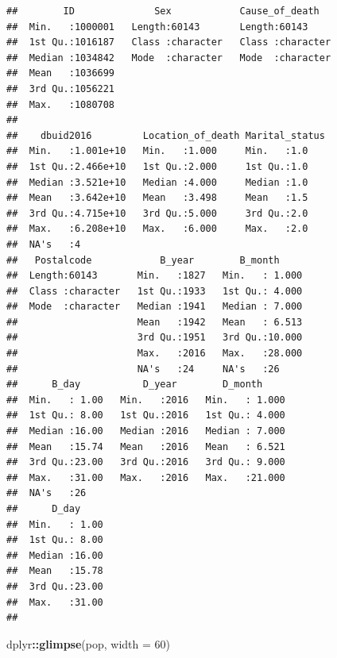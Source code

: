 \documentclass[
  11pt,
  oneside]{book}
\newenvironment{Shaded}{\begin{snugshade}}{\end{snugshade}}
\newcommand{\AttributeTok}[1]{\textcolor[rgb]{0.13,0.29,0.53}{#1}}
\newcommand{\DecValTok}[1]{\textcolor[rgb]{0.00,0.00,0.81}{#1}}
\newcommand{\FunctionTok}[1]{\textcolor[rgb]{0.13,0.29,0.53}{\textbf{#1}}}
\newcommand{\NormalTok}[1]{#1}
\newcommand{\SpecialCharTok}[1]{\textcolor[rgb]{0.81,0.36,0.00}{\textbf{#1}}}
\begin{document}
\begin{verbatim}
##        ID              Sex            Cause_of_death    
##  Min.   :1000001   Length:60143       Length:60143      
##  1st Qu.:1016187   Class :character   Class :character  
##  Median :1034842   Mode  :character   Mode  :character  
##  Mean   :1036699                                        
##  3rd Qu.:1056221                                        
##  Max.   :1080708                                        
##                                                         
##    dbuid2016         Location_of_death Marital_status
##  Min.   :1.001e+10   Min.   :1.000     Min.   :1.0   
##  1st Qu.:2.466e+10   1st Qu.:2.000     1st Qu.:1.0   
##  Median :3.521e+10   Median :4.000     Median :1.0   
##  Mean   :3.642e+10   Mean   :3.498     Mean   :1.5   
##  3rd Qu.:4.715e+10   3rd Qu.:5.000     3rd Qu.:2.0   
##  Max.   :6.208e+10   Max.   :6.000     Max.   :2.0   
##  NA's   :4                                           
##   Postalcode            B_year        B_month      
##  Length:60143       Min.   :1827   Min.   : 1.000  
##  Class :character   1st Qu.:1933   1st Qu.: 4.000  
##  Mode  :character   Median :1941   Median : 7.000  
##                     Mean   :1942   Mean   : 6.513  
##                     3rd Qu.:1951   3rd Qu.:10.000  
##                     Max.   :2016   Max.   :28.000  
##                     NA's   :24     NA's   :26      
##      B_day           D_year        D_month      
##  Min.   : 1.00   Min.   :2016   Min.   : 1.000  
##  1st Qu.: 8.00   1st Qu.:2016   1st Qu.: 4.000  
##  Median :16.00   Median :2016   Median : 7.000  
##  Mean   :15.74   Mean   :2016   Mean   : 6.521  
##  3rd Qu.:23.00   3rd Qu.:2016   3rd Qu.: 9.000  
##  Max.   :31.00   Max.   :2016   Max.   :21.000  
##  NA's   :26                                     
##      D_day      
##  Min.   : 1.00  
##  1st Qu.: 8.00  
##  Median :16.00  
##  Mean   :15.78  
##  3rd Qu.:23.00  
##  Max.   :31.00  
## 
\end{verbatim}

\begin{Shaded}
\begin{Highlighting}[]
\NormalTok{dplyr}\SpecialCharTok{::}\FunctionTok{glimpse}\NormalTok{(pop, }\AttributeTok{width =} \DecValTok{60}\NormalTok{)}
\end{Highlighting}
\end{Shaded}
\end{document}
